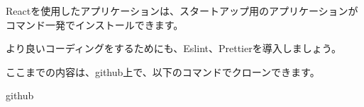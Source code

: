 Reactを使用したアプリケーションは、スタートアップ用のアプリケーションがコマンド一発でインストールできます。

より良いコーディングをするためにも、Eslint、Prettierを導入しましょう。

\begin{starternote}[]{}

ここまでの内容は、github上で、以下のコマンドでクローンできます。

\def\startercodeblockfontsize{}
\begin{starterterminal}[]{github}\end{starterterminal}
\end{starternote}
